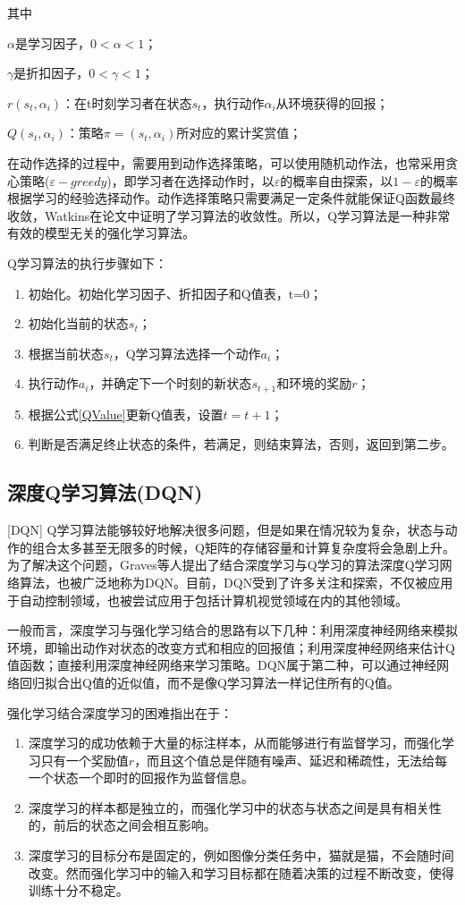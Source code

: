 其中

$\alpha$是学习因子，$0<\alpha <1$；

$\gamma$是折扣因子，$0<\gamma <1$；

$r(s_t,\alpha_i)$：在t时刻学习者在状态$s_t$，执行动作$\alpha_i$从环境获得的回报；

$Q(s_t,\alpha_i)$：策略$\pi=(s_t,\alpha_i)$所对应的累计奖赏值；

在动作选择的过程中，需要用到动作选择策略，可以使用随机动作法，也常采用贪心策略($\varepsilon-greedy$)，即学习者在选择动作时，以$\varepsilon$的概率自由探索，以$1-\varepsilon$的概率根据学习的经验选择动作。动作选择策略只需要满足一定条件就能保证Q函数最终收敛，Watkins在论文\cite{QLearning3}中证明了学习算法的收敛性。所以，Q学习算法是一种非常有效的模型无关的强化学习算法。

Q学习算法的执行步骤如下：
\begin{enumerate}
    \item 初始化。初始化学习因子、折扣因子和Q值表，t=0；
    \item 初始化当前的状态$s_t$；
    \item 根据当前状态$s_t$，Q学习算法选择一个动作$a_i$；
    \item 执行动作$a_i$，并确定下一个时刻的新状态$s_{t+1}$和环境的奖励$r$；
    \item 根据公式\ref{QValue}更新Q值表，设置$t = t+1$；
    \item 判断是否满足终止状态的条件，若满足，则结束算法，否则，返回到第二步。
\end{enumerate}

\subsection{深度Q学习算法(DQN)}[DQN]
Q学习算法能够较好地解决很多问题，但是如果在情况较为复杂，状态与动作的组合太多甚至无限多的时候，Q矩阵的存储容量和计算复杂度将会急剧上升。为了解决这个问题，Graves等人提出了结合深度学习与Q学习的算法深度Q学习网络算法\cite{DQNNature}，也被广泛地称为DQN。目前，DQN受到了许多关注和探索，不仅被应用于自动控制领域，也被尝试应用于包括计算机视觉领域在内的其他领域。

一般而言，深度学习与强化学习结合的思路有以下几种：利用深度神经网络来模拟环境，即输出动作对状态的改变方式和相应的回报值；利用深度神经网络来估计Q值函数；直接利用深度神经网络来学习策略。DQN属于第二种，可以通过神经网络回归拟合出Q值的近似值，而不是像Q学习算法一样记住所有的Q值。

强化学习结合深度学习的困难指出在于：
\begin{enumerate}    
    \item 深度学习的成功依赖于大量的标注样本，从而能够进行有监督学习，而强化学习只有一个奖励值$r$，而且这个值总是伴随有噪声、延迟和稀疏性，无法给每一个状态一个即时的回报作为监督信息。
    \item 深度学习的样本都是独立的，而强化学习中的状态与状态之间是具有相关性的，前后的状态之间会相互影响。
    \item 深度学习的目标分布是固定的，例如图像分类任务中，猫就是猫，不会随时间改变。然而强化学习中的输入和学习目标都在随着决策的过程不断改变，使得训练十分不稳定。
\end{enumerate}

